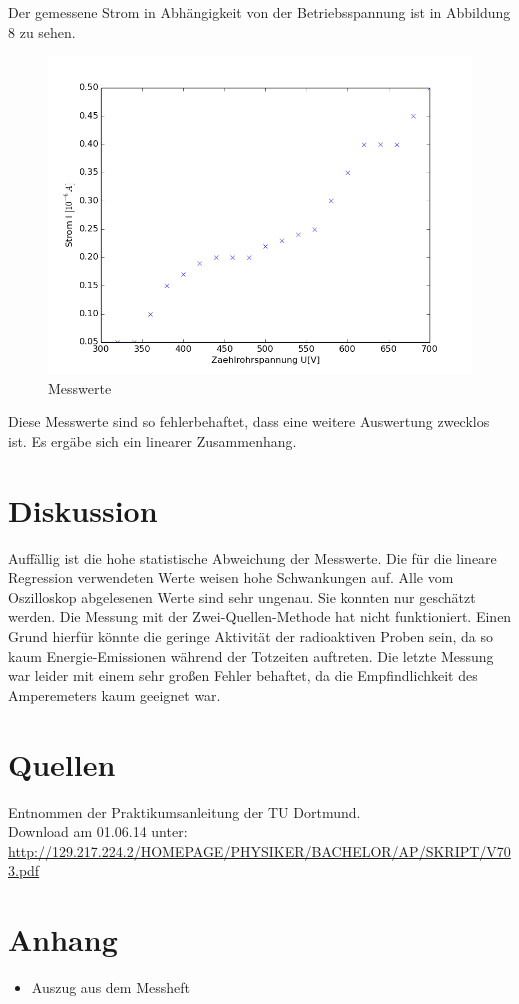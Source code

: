 \documentclass[11pt,ngerman,a4paper]{article}
\begin{document}
Der gemessene Strom in Abhängigkeit von der Betriebsspannung ist in Abbildung 8 zu sehen.
\begin{figure}[H]
\centering
\includegraphics[scale=0.6]{plot3.png}
\caption{Messwerte}
\label{plot3}
\end{figure}
\noindent
Diese Messwerte sind so fehlerbehaftet, dass eine weitere Auswertung zwecklos ist. Es ergäbe sich ein linearer Zusammenhang.
\section{Diskussion}
Auffällig ist die hohe statistische Abweichung der Messwerte. Die für die lineare Regression verwendeten Werte weisen hohe Schwankungen auf.
Alle vom Oszilloskop abgelesenen Werte sind sehr ungenau. Sie konnten nur geschätzt werden. Die Messung mit der Zwei-Quellen-Methode hat nicht funktioniert. Einen Grund hierfür könnte die geringe Aktivität der radioaktiven Proben sein, da so kaum Energie-Emissionen während der Totzeiten auftreten. Die letzte Messung war leider mit einem sehr großen Fehler behaftet, da die Empfindlichkeit des Amperemeters kaum geeignet war.

\section{Quellen}
\begin{enumerate}[{[}1{]}]
\item Entnommen der Praktikumsanleitung \textit{} der TU Dortmund. \\
Download am 01.06.14 unter:\\
 \url{http://129.217.224.2/HOMEPAGE/PHYSIKER/BACHELOR/AP/SKRIPT/V703.pdf}
\end{enumerate}

\section{Anhang}
\begin{itemize}
\item Auszug aus dem Messheft
\end{itemize}
\end{document}
